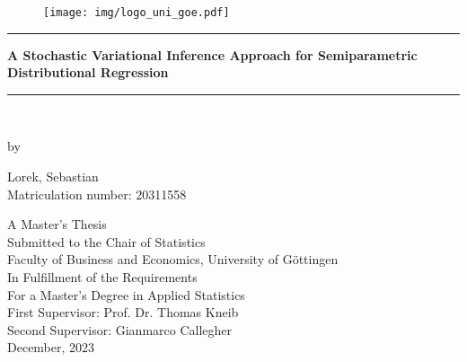 \thispagestyle{empty}

\vspace*{\fill}

\begin{figure}[htbp]
  \centering
  \texttt{[image: img/logo\_uni\_goe.pdf]}
\end{figure}

\bigskip

\begin{center}

\rule{\linewidth}{0.5mm}

{\Large \textbf{A Stochastic Variational Inference Approach for Semiparametric
                Distributional Regression}}

\rule{\linewidth}{0.5mm} \\

\end{center}

\bigskip

\begin{center}

by \\

\bigskip

Lorek, Sebastian \\
Matriculation number: 20311558

\end{center}

\bigskip

\begin{center}

A Master's Thesis \\
Submitted to the Chair of Statistics \\
Faculty of Business and Economics, University of Göttingen \\
In Fulfillment of the Requirements \\
For a Master's Degree in Applied Statistics\\
First Supervisor: Prof. Dr. Thomas Kneib \\
Second Supervisor: Gianmarco Callegher \\
December, 2023 \\

\end{center}


\vspace*{\fill}

